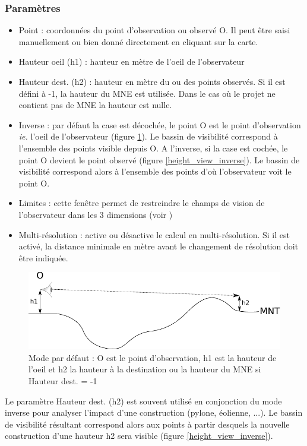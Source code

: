 \documentclass{report}
\begin{document}
\subsubsection{Paramètres}
\label{viewshed_param}
\begin{itemize}
	\item Point : coordonnées du point d'observation ou observé O. Il peut être saisi manuellement ou bien donné directement en cliquant sur la carte.
	\item Hauteur oeil (h1) : hauteur en mètre de l'oeil de l'observateur
	\item Hauteur dest. (h2) : hauteur en mètre du ou des points observés. Si il est défini à -1, la hauteur du MNE est utilisée. Dans le cas où le projet ne contient pas de MNE la hauteur est nulle.
	\item Inverse : par défaut la case est décochée, le point O est le point d'observation \textit{ie.} l'oeil de l'observateur (figure \ref{height_view}). Le bassin de visibilité correspond à l'ensemble des points visible depuis O. A l'inverse, si la case est cochée, le point O devient le point observé (figure \ref{height_view_inverse}). Le bassin de visibilité correspond alors à l'ensemble des points d'où l'observateur voit le point O.
	\item Limites : cette fenêtre permet de restreindre le champs de vision de l'observateur dans les 3 dimensions (voir )
	\item Multi-résolution : active ou désactive le calcul en multi-résolution. Si il est activé, la distance minimale en mètre avant le changement de résolution doit être indiquée.
\end{itemize}


\begin{figure}[H]
	\includegraphics{img/height_view.pdf} 
	\caption{Mode par défaut : O est le point d'observation, h1 est la hauteur de l'oeil et h2 la hauteur à la destination ou la hauteur du MNE si Hauteur dest. = -1}
	\label{height_view}
\end{figure}

Le paramètre Hauteur dest. (h2) est souvent utilisé en conjonction du mode inverse pour analyser l'impact d'une construction (pylone, éolienne, ...). Le bassin de visibilité résultant correspond alors aux points à partir desquels la nouvelle construction d'une hauteur h2 sera visible (figure \ref{height_view_inverse}).
\end{document}
